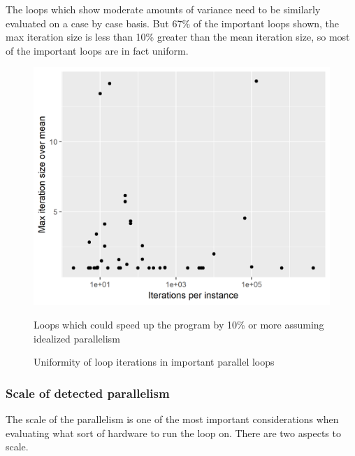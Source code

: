 \documentclass[12pt,twoside]{reedthesis}
\begin{document}
		The loops which show moderate amounts of variance need to be similarly evaluated on a case by case basis. But 67\% of the important loops shown, the max iteration size is less than 10\% greater than the mean iteration size, so most of the important loops are in fact uniform. 
		
		
		
		\begin{figure}
			\caption{Uniformity of loop iterations in important parallel loops}
			\label{fig:uniformity-tail-etc}
			
			\begin{minipage}{0.6\textwidth} %
				\includegraphics[scale=0.7]{plots/tail_iters.png}
				{\footnotesize Loops which could speed up the program by 10\% or more assuming idealized parallelism \par}
			\end{minipage}
		\end{figure}
		
		\subsubsection{Scale of detected parallelism}
		
		The scale of the parallelism is one of the most important considerations when evaluating what sort of hardware to run the loop on. There are two aspects to scale. 
		
\end{document}
